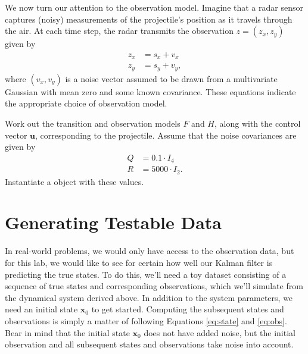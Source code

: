 We now turn our attention to the observation model.
Imagine that a radar sensor captures (noisy) measurements of the projectile's position as it travels through the air.
At each time step, the radar transmits the observation $z = (z_x, z_y)$ given by
\begin{align*}
z_x &= s_x + v_x\\
z_y &= s_y + v_y,
\end{align*}
where $(v_x, v_y)$ is a noise vector assumed to be drawn from a multivariate Gaussian with mean zero and some known covariance.
These equations indicate the appropriate choice of observation model.

\begin{problem}
Work out the transition and observation models $F$ and $H$, along with the control vector $\mathbf{u}$, corresponding to the projectile.
Assume that the noise covariances are given by
\begin{align*}
Q &= 0.1 \cdot I_4\\
R &= 5000 \cdot I_2.
\end{align*}
Instantiate a  object with these values.
\end{problem}


\section*{Generating Testable Data}
In real-world problems, we would only have access to the observation data, but for this lab, we would like to see for certain how well our Kalman filter is predicting the true states.
To do this, we'll need a toy dataset consisting of a sequence of true states and corresponding observations, which we'll simulate from the dynamical system derived above.
In addition to the system parameters, we need an initial state $\mathbf{x}_0$ to get started.
Computing the subsequent states and observations is simply a matter of following Equations \ref{eq:state} and \ref{eq:obs}.
Bear in mind that the initial state $\mathbf{x}_0$ does not have added noise, but the initial observation and all subsequent states and observations take noise into account.

